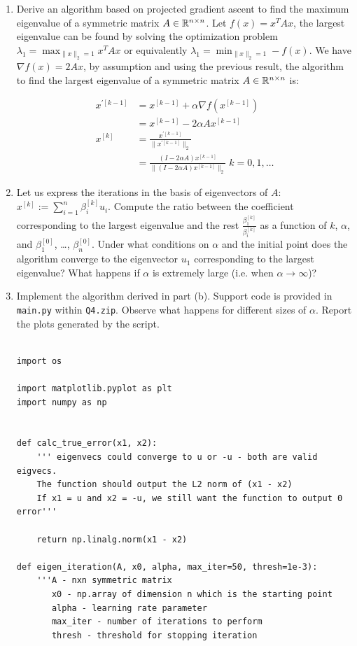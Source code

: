 \documentclass[12pt,twoside]{article}
\begin{document}
\begin{enumerate}
\begin{enumerate}
\item Derive an algorithm based on projected gradient ascent to find the maximum eigenvalue of a symmetric matrix $A\in \mathbb{R}^{n \times n}$.
Let $f(x) = x^T A x$, the largest eigenvalue can be found by solving the optimization problem $\lambda_1= \max _{\|x\|_2=1} x^T A x$ or equivalently $\lambda_1 = \min_{\|x\|_2=1}  - f(x)$.
We have $\nabla{f(x)} = 2 A x$, by assumption and using the previous result, the algorithm to find the largest eigenvalue of a symmetric matrix $A\in \mathbb{R}^{n \times n}$ is:

\begin{align*}
	x^{'[k-1]}	&= x^{[k-1]} + \alpha \nabla{f(x^{[k-1]} )} \\
			&= x^{[k-1]} -2 \alpha A x^{[k-1]} \\
	x^{[k]}	&= \frac{x^{'[k-1]}}{\|x^{'[k-1]}\|_2} \\
			&= \frac{(I - 2 \alpha A) x^{[k-1]}}{ \| (I - 2 \alpha A) x^{[k-1]} \|_2} \; k=0,1, \ldots
\end{align*}


\item Let us express the iterations in the basis of eigenvectors of $A$: $x^{[k]} := \sum_{i=1}^{n}\beta_i^{[k]} u_i$. Compute the ratio between the coefficient corresponding to the largest eigenvalue and the rest $\frac{\beta_1^{[k]}}{\beta_i^{[k]}}$ as a function of $k$, $\alpha$, and $\beta_1^{[0]}$, \ldots, $\beta_n^{[0]}$. Under what conditions on $\alpha$ and the initial point does the algorithm converge to the eigenvector $u_1$ corresponding to the largest eigenvalue? What happens if $\alpha$ is extremely large (i.e. when $\alpha \rightarrow \infty$)?
\item Implement the algorithm derived in part (b). Support code is provided in {\tt main.py} within {\tt Q4.zip}. Observe what happens for different sizes of $\alpha$. Report the plots generated by the script.

\begin{verbatim}

import os

import matplotlib.pyplot as plt
import numpy as np


def calc_true_error(x1, x2):
    ''' eigenvecs could converge to u or -u - both are valid eigvecs. 
    The function should output the L2 norm of (x1 - x2)
    If x1 = u and x2 = -u, we still want the function to output 0 error'''

    return np.linalg.norm(x1 - x2)

def eigen_iteration(A, x0, alpha, max_iter=50, thresh=1e-3):
    '''A - nxn symmetric matrix
       x0 - np.array of dimension n which is the starting point
       alpha - learning rate parameter
       max_iter - number of iterations to perform
       thresh - threshold for stopping iteration
       

\end{verbatim}
\end{enumerate}
\end{enumerate}
\end{document}
